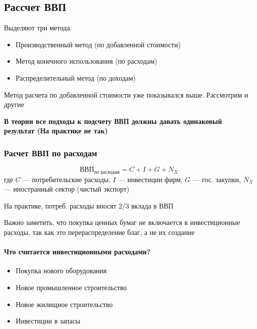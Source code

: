 \documentclass{article}
\begin{document}
    \subsection{Рассчет ВВП}
    Выделяют три метода:

    \begin{itemize}
        \item Производственный метод (по добавленной стоимости)
        \item Метод конечного использования (по расходам)
        \item Распределительный метод (по доходам)
    \end{itemize}

    Метод расчета по добавленной стоимости уже показывался выше. Рассмотрим и другие

    \quad

    \textbf{В теории все подходы к подсчету ВВП должны давать одинаковый результат (На практике не так)}


    \subsubsection{Расчет ВВП по расходам}

    \begin{equation}
        \text{ВВП}_{\text{по расходам}} = C + I + G + N_{X}
    \end{equation}
    где $C$ --- потребительские расходы, $I$ --- инвестиции фирм, $G$ --- гос. закупки, $N_{X}$ --- иностранный сектор (чистый экспорт)

    На практике, потреб. расходы вносят 2/3 вклада в ВВП

    \quad

    Важно заметить, что покупка ценных бумаг не включается в инвестиционные расходы, так как это перераспределение благ, а не их создание

    \quad

    \paragraph{Что считается инвестиционными расходами?}

    \begin{itemize}
        \item Покупка нового оборудования
        \item Новое промышленное строительство
        \item Новое жилищное строительство
        \item Инвестиции в запасы
    \end{itemize}
\end{document}
